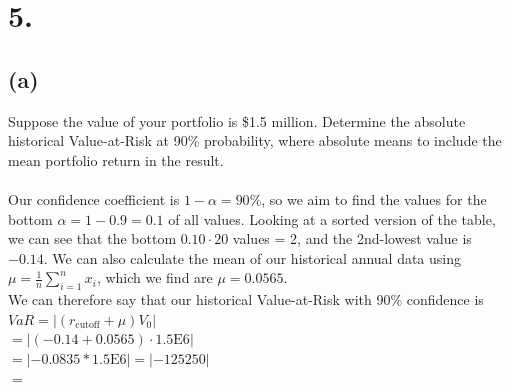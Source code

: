 \documentclass{article}
\begin{document}
\section*{5.}
{\Large 

\subsection*{(a)}

Suppose the value of your portfolio is \$1.5 million. Determine the absolute historical Value-at-Risk at 90\% probability, where absolute means to include the mean portfolio return in the result. \\ \\


Our confidence coefficient is $1 - \alpha = 90\%$, so we aim to find the values for the bottom $\alpha = 1 - 0.9 = 0.1$ of all values. Looking at a sorted version of the table, we can see that the bottom $0.10 \cdot 20$ values = 2, and the 2nd-lowest value is $-0.14$. We can also calculate the mean of our historical annual data using $\mu = \frac{1}{n} \sum_{i=1}^{n} x_i$, which we find are $\mu = 0.0565$. \\
We can therefore say that our historical Value-at-Risk with 90\% confidence is \\
$VaR = |(r_\text{cutoff} + \mu)V_0|$ \\
$= |(-0.14 + 0.0565) \cdot 1.5\text{E6}|$ \\
$= |-0.0835 * 1.5\text{E6}| = |-125250|$ \\
$= $ 

}
\end{document}
